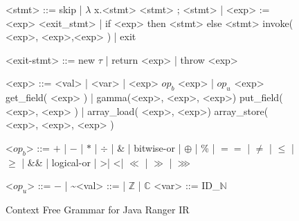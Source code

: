 %
\begin{figure}
\begin{grammar}
<stmt> ::= skip | $\lambda$ x.<stmt> 
\alt <stmt> ; <stmt> | <exp> := <exp>
\alt <exit_stmt> | if <exp> then <stmt> else <stmt> 
\alt invoke( <exp>, <exp>,<exp> )  | exit


<exit-stmt> ::=  new $\tau$  | return <exp> |  throw <exp> 

<exp>  ::=  <val> | <var> | <exp> $op_b$ <exp>  | $op_u$ <exp> 
\alt get_field( <exp> ) | gamma(<exp>, <exp>, <exp>)
\alt put_field( <exp>, <exp> ) | array_load( <exp>, <exp>) 
\alt array_store( <exp>, <exp>, <exp> ) 

<$op_b$> ::= $+$ | $-$ | $*$ | $\div$ | \& | bitwise-or | $\oplus$ | \% | $==$ | $\neq$ | $\leq$ | $\geq$ | \&\& | logical-or | \textgreater | \textless | $\ll$ | $\gg$ | $\ggg$

<$op_u$> ::= $-$ | \textasciitilde  \quad <val> ::= \unit | $\mathbb{Z}$ |  $\mathbb{C}$ \quad <var> ::= ID_$\mathbb{N}$
\end{grammar}
\caption{Context Free Grammar for Java Ranger IR}
\label{fig:grammar}
\end{figure}


